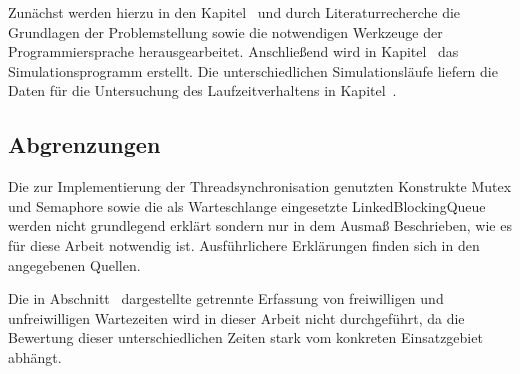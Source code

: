 Zunächst werden hierzu in den Kapitel~ und  durch Literaturrecherche die Grundlagen der Problemstellung sowie die notwendigen Werkzeuge der Programmiersprache herausgearbeitet. Anschließend wird in Kapitel~ das Simulationsprogramm erstellt. Die unterschiedlichen Simulationsläufe liefern die Daten für die Untersuchung des Laufzeitverhaltens in Kapitel~.


\subsection{Abgrenzungen} %
\label{sub:abgrenzungen}

Die zur Implementierung der Threadsynchronisation genutzten Konstrukte \ac{Mutex} und Semaphore sowie die als Warteschlange eingesetzte LinkedBlockingQueue werden nicht grundlegend erklärt sondern nur in dem Ausmaß Beschrieben, wie es für diese Arbeit notwendig ist. Ausführlichere Erklärungen finden sich in den angegebenen Quellen.

Die in Abschnitt~ dargestellte getrennte Erfassung von freiwilligen und unfreiwilligen Wartezeiten wird in dieser Arbeit nicht durchgeführt, da die Bewertung dieser unterschiedlichen Zeiten stark vom konkreten Einsatzgebiet abhängt.


